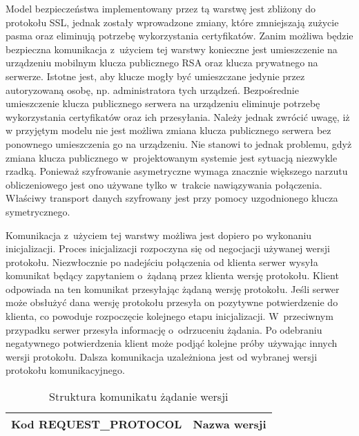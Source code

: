 Model bezpieczeństwa implementowany przez tą warstwę jest zbliżony do
protokołu SSL, jednak zostały wprowadzone zmiany, które zmniejszają
zużycie pasma oraz eliminują potrzebę wykorzystania
certyfikatów. Zanim możliwa będzie bezpieczna komunikacja z~użyciem
tej warstwy konieczne jest umieszczenie na urządzeniu mobilnym klucza
publicznego RSA oraz klucza prywatnego na serwerze. Istotne jest, aby
klucze mogły być umieszczane jedynie przez autoryzowaną osobę,
np. administratora tych urządzeń. Bezpośrednie umieszczenie klucza
publicznego serwera na urządzeniu eliminuje potrzebę wykorzystania
certyfikatów oraz ich przesyłania. Należy jednak zwrócić uwagę, iż w
przyjętym modelu nie jest możliwa zmiana klucza publicznego serwera
bez ponownego umieszczenia go na urządzeniu. Nie stanowi to jednak
problemu, gdyż zmiana klucza publicznego w~projektowanym systemie jest
sytuacją niezwykle rzadką. Ponieważ szyfrowanie asymetryczne wymaga
znacznie większego narzutu obliczeniowego jest ono używane tylko
w~trakcie nawiązywania połączenia. Właściwy transport danych
szyfrowany jest przy pomocy uzgodnionego klucza symetrycznego.

Komunikacja z~użyciem tej warstwy możliwa jest dopiero po wykonaniu
inicjalizacji. Proces inicjalizacji rozpoczyna się od negocjacji
używanej wersji protokołu. Niezwłocznie po nadejściu połączenia od
klienta serwer wysyła komunikat będący zapytaniem o~żądaną przez
klienta wersję protokołu. Klient odpowiada na ten komunikat
przesyłając żądaną wersję protokołu. Jeśli serwer może obsłużyć dana
wersję protokołu przesyła on pozytywne potwierdzenie do klienta, co
powoduje rozpoczęcie kolejnego etapu inicjalizacji. W~przeciwnym
przypadku serwer przesyła informację o~odrzuceniu żądania. Po
odebraniu negatywnego potwierdzenia klient może podjąć kolejne próby
używając innych wersji protokołu. Dalsza komunikacja uzależniona jest
od wybranej wersji protokołu komunikacyjnego.

\begin{table}[H]
\centering
\caption{Struktura komunikatu żądanie wersji}

\begin{tabular}{|p{5cm}|p{6cm}|}
\hline
\raggedright{Kod REQUEST\_PROTOCOL} & Nazwa wersji\\
\hline
\end{tabular}
\end{table}

